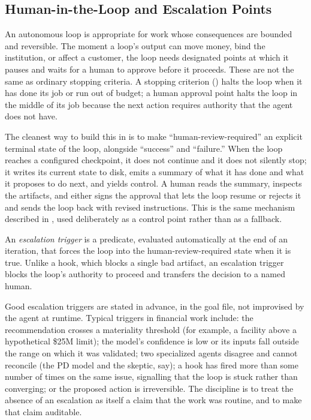 \subsection{Human-in-the-Loop and Escalation Points}\label{subsec:human-in-the-loop}

An autonomous loop is appropriate for work whose consequences are bounded and
reversible. The moment a loop's output can move money, bind the institution, or
affect a customer, the loop needs designated points at which it pauses and waits
for a human to approve before it proceeds. These are not the same as ordinary
stopping criteria. A stopping criterion () halts
the loop when it has done its job or run out of budget; a human approval point
halts the loop in the middle of its job because the next action requires
authority that the agent does not have.

The cleanest way to build this in is to make ``human-review-required'' an
explicit terminal state of the loop, alongside ``success'' and ``failure.''
When the loop reaches a configured checkpoint, it does not continue and it does
not silently stop; it writes its current state to disk, emits a summary of what
it has done and what it proposes to do next, and yields control. A human reads
the summary, inspects the artifacts, and either signs the approval that lets the
loop resume or rejects it and sends the loop back with revised instructions.
This is the same mechanism described in , used
deliberately as a control point rather than as a fallback.

\begin{definition}\label{def:escalation-trigger}
An \emph{escalation trigger} is a predicate, evaluated automatically at the end
of an iteration, that forces the loop into the human-review-required state when
it is true. Unlike a hook, which blocks a single bad artifact, an escalation
trigger blocks the loop's authority to proceed and transfers the decision to a
named human.
\end{definition}

Good escalation triggers are stated in advance, in the goal file, not improvised
by the agent at runtime. Typical triggers in financial work include: the
recommendation crosses a materiality threshold (for example, a facility above a
hypothetical \$25M limit); the model's confidence is low or its inputs fall
outside the range on which it was validated; two specialized agents disagree and
cannot reconcile (the PD model and the skeptic, say); a hook has fired more than
some number of times on the same issue, signalling that the loop is stuck rather
than converging; or the proposed action is irreversible. The discipline is to
treat the absence of an escalation as itself a claim that the work was routine,
and to make that claim auditable.


